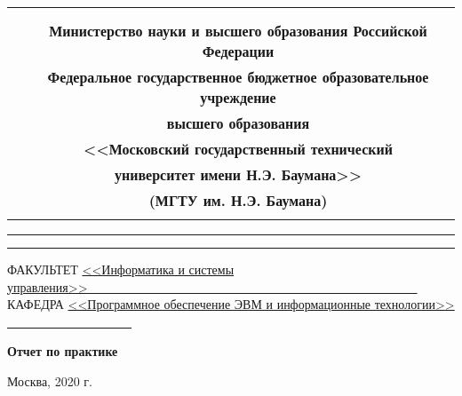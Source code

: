 
  \begin{titlepage}
  	
  	\begin{table}[H]
  		\centering
  		\footnotesize
  		\begin{tabular}{cc}
  			& \\
  			& \\
  			& \textbf{Министерство науки и высшего образования Российской Федерации} \\
  			& \textbf{Федеральное государственное бюджетное образовательное учреждение} \\
  			& \textbf{высшего образования} \\
  			& \textbf{<<Московский государственный технический} \\
  			& \textbf{университет имени Н.Э. Баумана>>} \\
  			& \textbf{(МГТУ им. Н.Э. Баумана)} \\
  			& \textbf{} \\
  		\end{tabular}
  	\end{table}
  	
  	\vspace{-2.5cm}
  	
  	\begin{flushleft}
  		\rule[-1cm]{\textwidth}{3pt}
  		\rule{\textwidth}{1pt}
  	\end{flushleft}
  	
  	\begin{flushleft}
  		\small
  		ФАКУЛЬТЕТ
  		\underline{<<Информатика и системы управления>>\ \ \ \ \ \ \ 
  			\ \ \ \ \ \ \ \ \ \ \ \ \ \ \ \ \ \ \ \ \ \ \ \ \ \ \ \ \ \ \ 
  			\ \ \ \ \ \ \ \ \ \ \ \ \ \ \ } \\
  		КАФЕДРА
  		\underline{<<Программное обеспечение ЭВМ и
  			информационные технологии>>
  			\ \ \ \ \ \ \ \ \ \ \ \ \ \ \ \ \ \ \ \ }
  	\end{flushleft}
  	
  	\vspace{2cm}
  	
  	\begin{center}
  		\textbf{Отчет по практике} \\
  	\end{center}
  	
  	\vspace{4cm}
  	
  	\vspace{6cm}
  	
  	\begin{center}
  		Москва, 2020 г.
  	\end{center}
  	
  	
  \end{titlepage}